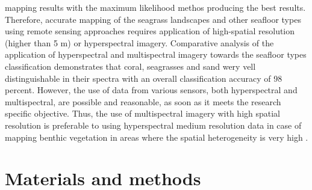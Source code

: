 \documentclass[10pt, a4paper]{article}
\begin{document}
mapping results with the maximum likelihood methos producing the best results.
Therefore, accurate mapping of the seagrass landscapes and other seafloor types using remote sensing
approaches requires application of high-spatial resolution (higher than 5 m) or hyperspectral imagery.
Comparative analysis of the application of hyperspectral and multispectral imagery towards the
seafloor types classification \cite{Hochberg03a}\label{Hochberg03a} demonstrates that coral, seagrasses and
sand wery vell distinguishable in their spectra with an overall classification accuracy of 98 percent.
However, the use of data from various sensors, both hyperspectral and multispectral, are possible and
reasonable, as soon as it meets the research specific objective. 
Thus, the use of multispectral imagery
with high spatial resolution is preferable to using hyperspectral medium resolution data in case of
mapping benthic vegetation in areas where the spatial heterogeneity is very high \cite{Vahtmae07}\label{Vahtmae07}.

\section{Materials and methods}
\end{document}
